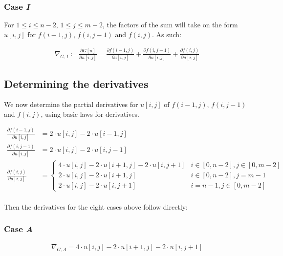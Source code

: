 \documentclass[a4paper]{scrreprt}
\begin{document}
\subsubsection{Case \emph{I}}

For $1 \leq i \leq n - 2$, $1 \leq j \leq m - 2$, the factors of the sum will
take on the form $u[i, j]$ for $f(i - 1, j)$, $f(i, j - 1)$ and $f(i, j)$. As
such:

\begin{align*}
		\nabla_{G, I} \coloneqq \frac{\partial G[u]}{\partial u[i, j]} = 
		  \frac{\partial f(i - 1, j)}{\partial u[i, j]}
		  + \frac{\partial f(i, j - 1)}{\partial u[i, j]}
		  + \frac{\partial f(i, j)}{\partial u[i, j]}
\end{align*}

\subsection{Determining the derivatives}

We now determine the partial derivatives for $u[i, j]$ of $f(i - 1, j)$, $f(i,
j - 1)$ and $f(i, j)$, using basic laws for derivatives.

\begin{align*}
		\frac{\partial f(i - 1, j)}{\partial u[i, j]} & =
		  2 \cdot u[i, j] - 2 \cdot u[i - 1, j] \\
		\frac{\partial f(i, j - 1)}{\partial u[i, j]} & =
		  2 \cdot u[i, j] - 2 \cdot u[i, j - 1] \\
		\frac{\partial f(i, j)}{\partial u[i, j]} & =
		  \begin{cases}
				  4 \cdot u[i, j] - 2 \cdot u[i + 1, j] - 2 \cdot u[i, j + 1] 
				    & i \in [0, n - 2], j \in [0, m - 2] \\
				  2 \cdot u[i, j] - 2 \cdot u[i + 1, j] 
				    & i \in [0, n - 2], j = m - 1 \\
				  2 \cdot u[i, j] - 2 \cdot u[i, j + 1] 
					& i = n - 1, j \in [0, m - 2]
		  \end{cases} \\
\end{align*}

Then the derivatives for the eight cases above follow directly:

\subsubsection{Case \emph{A}}

\begin{align*}
		\nabla_{G, A} = 
		  4 \cdot u[i, j] - 2 \cdot u[i + 1, j] - 2 \cdot u[i, j + 1]
\end{align*}
\end{document}
